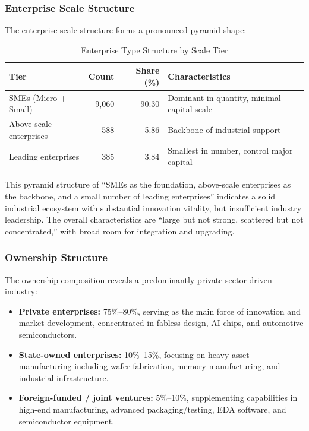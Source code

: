 \documentclass[12pt,a4paper]{article}
\newcommand{\tableHeaderRow}{\rowcolor{tealPrimary}\color{white}}
\newcommand{\tableOddRow}{\rowcolor{mintBG}}
\newcommand{\tableEvenRow}{\rowcolor{white}}
\begin{document}
\subsubsection{Enterprise Scale Structure}

The enterprise scale structure forms a pronounced pyramid shape:

\begin{table}[H]
\centering
\caption{Enterprise Type Structure by Scale Tier}
\label{tab:enterprise_tiers}
\begin{tabular}{lrrl}
\toprule
\tableHeaderRow
\textbf{Tier} & \textbf{Count} & \textbf{Share (\%)} & \textbf{Characteristics} \\
\midrule
\tableOddRow  SMEs (Micro + Small)     & 9,060 & 90.30 & Dominant in quantity, minimal capital scale \\
\tableEvenRow Above-scale enterprises  & 588   & 5.86  & Backbone of industrial support \\
\tableOddRow  Leading enterprises       & 385   & 3.84  & Smallest in number, control major capital \\
\bottomrule
\end{tabular}
\end{table}

This pyramid structure of ``SMEs as the foundation, above-scale enterprises as
the backbone, and a small number of leading enterprises'' indicates a solid
industrial ecosystem with substantial innovation vitality, but insufficient
industry leadership. The overall characteristics are ``large but not strong,
scattered but not concentrated,'' with broad room for integration and upgrading.

\subsubsection{Ownership Structure}

The ownership composition reveals a predominantly private-sector-driven industry:

\begin{itemize}
    \item \textbf{Private enterprises:} 75\%--80\%, serving as the main force
          of innovation and market development, concentrated in fabless design,
          AI chips, and automotive semiconductors.
    \item \textbf{State-owned enterprises:} 10\%--15\%, focusing on heavy-asset
          manufacturing including wafer fabrication, memory manufacturing, and
          industrial infrastructure.
    \item \textbf{Foreign-funded / joint ventures:} 5\%--10\%, supplementing
          capabilities in high-end manufacturing, advanced packaging/testing,
          EDA software, and semiconductor equipment.
\end{itemize}
\end{document}
